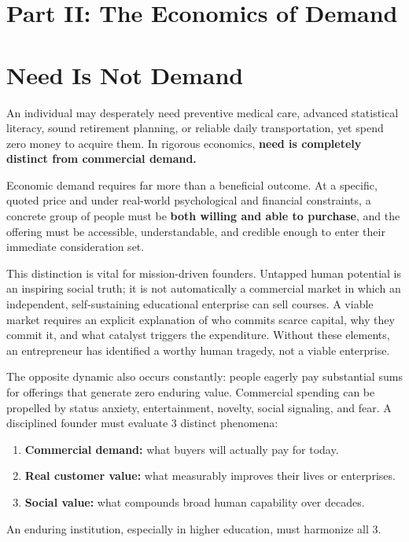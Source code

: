 \section*{Part II: The Economics of Demand}

\section{Need Is Not Demand}

An individual may desperately need preventive medical care, advanced statistical literacy, sound retirement planning, or reliable daily transportation, yet spend zero money to acquire them. In rigorous economics, \textbf{need is completely distinct from commercial demand.}

Economic demand requires far more than a beneficial outcome. At a specific, quoted price and under real-world psychological and financial constraints, a concrete group of people must be \textbf{both willing and able to purchase}, and the offering must be accessible, understandable, and credible enough to enter their immediate consideration set.

This distinction is vital for mission-driven founders. Untapped human potential is an inspiring social truth; it is not automatically a commercial market in which an independent, self-sustaining educational enterprise can sell courses. A viable market requires an explicit explanation of who commits scarce capital, why they commit it, and what catalyst triggers the expenditure. Without these elements, an entrepreneur has identified a worthy human tragedy, not a viable enterprise.

The opposite dynamic also occurs constantly: people eagerly pay substantial sums for offerings that generate zero enduring value. Commercial spending can be propelled by status anxiety, entertainment, novelty, social signaling, and fear. A disciplined founder must evaluate 3 distinct phenomena:
\begin{enumerate}[leftmargin=12pt,itemsep=1pt,topsep=1pt,parsep=0pt]
  \item \textbf{Commercial demand:} what buyers will actually pay for today.
  \item \textbf{Real customer value:} what measurably improves their lives or enterprises.
  \item \textbf{Social value:} what compounds broad human capability over decades.
\end{enumerate}
An enduring institution, especially in higher education, must harmonize all 3.

